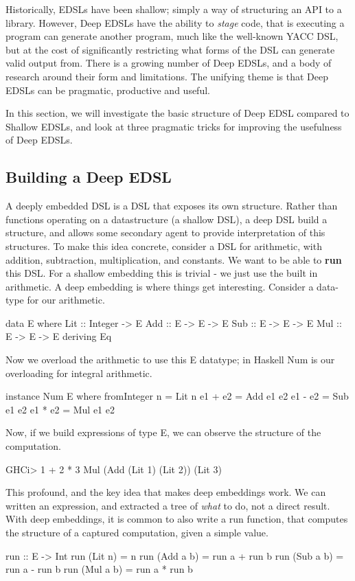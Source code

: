 \documentclass[11pt]{article}
\begin{document}
Historically, EDSLs have been shallow; simply a way of structuring an API to a library. 
However, Deep EDSLs have the ability to {\em stage\/} code, that is executing a program
can generate another program, much like the well-known YACC DSL,
but at the cost of significantly restricting what forms of the DSL can
generate valid output from.
There is a growing number of Deep EDSLs, and a body of research around their
form and limitations.
The unifying theme is that Deep EDSLs can be pragmatic, productive and useful.

In this section, we will investigate the basic structure of Deep EDSL compared to Shallow EDSLs,
and look at three pragmatic tricks for improving the usefulness of Deep EDSLs.

\subsection{Building a Deep EDSL}

A deeply embedded DSL is a DSL that exposes its own structure.
Rather than functions operating on a datastructure (a shallow DSL),
a deep DSL build a structure, and allows some secondary agent to
provide interpretation of this structures.
To make this idea concrete, consider a DSL for arithmetic,
with addition, subtraction, multiplication, and constants.
We want to be able to {\bf run\/} this DSL. For a shallow
embedding this is trivial - we just use the built in 
arithmetic. A deep embedding is where things get
interesting. Consider a data-type for our arithmetic.

\begin{Code}
data E where
 Lit :: Integer -> E
 Add :: E -> E -> E
 Sub :: E -> E -> E
 Mul :: E -> E -> E
 deriving Eq
\end{Code}

Now we overload the arithmetic to use this E datatype;
in Haskell Num is our overloading for integral arithmetic.

\begin{Code}
instance Num E where
  fromInteger n = Lit n
  e1 + e2 = Add e1 e2
  e1 - e2 = Sub e1 e2
  e1 * e2 = Mul e1 e2
\end{Code}

Now, if we build expressions of type E, we can
observe the structure of the computation.
\begin{SemiCode}
GHCi> 1 + 2 * 3
Mul (Add (Lit 1) (Lit 2)) (Lit 3)
\end{SemiCode}

This profound, and the key idea that makes deep embeddings work. We can written
an expression, and extracted a tree of {\em what\/} to do, not a direct result.
With deep embeddings, it is common to also
write a run function, that computes the structure
of a captured computation, given a simple value.
\begin{Code}
run :: E -> Int
run (Lit n) = n
run (Add a b) = run a + run b
run (Sub a b) = run a - run b
run (Mul a b) = run a * run b
\end{Code}
\end{document}
